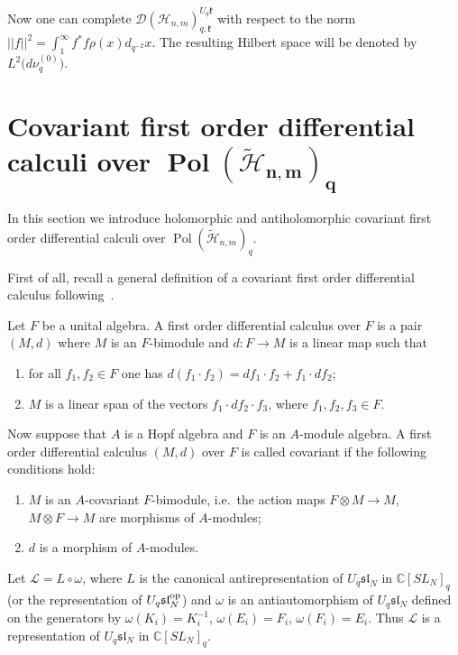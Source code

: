 \documentclass[pdftex]{sigma}
\begin{document}
Now one can complete $\mathscr{D}(\mathscr{H}_{n,m})_{q,\mathfrak{k}}^{U_q \mathfrak{k}}$ with respect to the
norm $||f||^2=\int_1^\infty f^*f \rho(x)d_{q^{-2}}x$. The resulting Hilbert space will be denoted by
$L^2\big(d\nu_q^{(0)}\big)$.



\section[Covariant first order differential calculi over $\operatorname{Pol}(\widetilde{\mathscr{H}}_{n,m})_q$]{Covariant f\/irst order dif\/ferential calculi over $\boldsymbol{\operatorname{Pol}(\widetilde{\mathscr{H}}_{n,m})_q}$}
\label{sec_5}

In this section we introduce   holomorphic and antiholomorphic covariant f\/irst order dif\/ferential calculi
over $\operatorname{Pol}(\widetilde{\mathscr{H}}_{n,m})_q$.

First of all, recall a general def\/inition of a covariant f\/irst order dif\/ferential calculus fol\-lowing~\cite{Kl-Sch}.

Let $F$ be a unital algebra. A f\/irst order dif\/ferential calculus over $F$ is a pair $(M,d)$ where $M$ is an
$F$-bimodule and $d:F \rightarrow M$ is a linear map such that
\begin{enumerate}\itemsep=0pt
\item for all $f_1,f_2 \in F$ one has $d(f_1 \cdot f_2)=df_1 \cdot f_2+f_1 \cdot df_2$;
\item $M$ is a linear span of the vectors $f_1 \cdot df_2 \cdot f_3$, where $f_1,f_2,f_3 \in F$.
\end{enumerate}

Now suppose that $A$ is a Hopf algebra and $F$ is an $A$-module algebra. A f\/irst order dif\/ferential calculus
$(M,d)$ over $F$ is called covariant if the following conditions hold:
\begin{enumerate}\itemsep=0pt
\item $M$ is an $A$-covariant $F$-bimodule, i.e.\ the action maps $F \otimes M \rightarrow M$, $M \otimes F \rightarrow M$
are morphisms of $A$-modules;
\item $d$ is a morphism of $A$-modules.
\end{enumerate}

Let $\mathcal{L}=L \circ \omega$, where $L$ is the canonical antirepresentation of $U_q \mathfrak{sl}_N$ in
$\mathbb C[SL_N]_q$ (or the representation of $U_q \mathfrak{sl}_N^{\rm op}$) and $\omega$ is an
antiautomorphism of $U_q \mathfrak{sl}_N$ def\/ined on the generators by $\omega(K_i)=K_i^{-1}$,
$\omega(E_i)=F_i$, $\omega(F_i)=E_i$. Thus $\mathcal{L}$ is a representation of $U_q \mathfrak{sl}_N$ in
$\mathbb C[SL_N]_q$.
\end{document}
